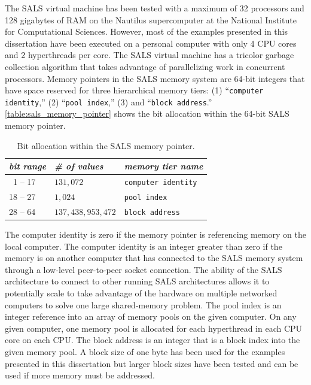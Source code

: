 The SALS virtual machine has been tested with a maximum of 32
processors and 128 gigabytes of RAM on the Nautilus supercomputer at
the National Institute for Computational Sciences.  However, most of
the examples presented in this dissertation have been executed on a
personal computer with only 4 CPU cores and 2 hyperthreads per core.
The SALS virtual machine has a tricolor garbage collection algorithm
that takes advantage of parallelizing work in concurrent processors.
Memory pointers in the SALS memory system are 64-bit integers that
have space reserved for three hierarchical memory tiers: (1)
``{\tt{computer identity}},'' (2) ``{\tt{pool index}},'' (3) and
``{\tt{block address}}.''
{\mbox{\autoref{table:sals_memory_pointer}}} shows the bit allocation
within the 64-bit SALS memory pointer.
\begin{table}
\centering
\begin{tabular}{|l|l|l|}
\hline
\emph{bit range} &\emph{\# of values} &\emph{memory tier name} \\
\hline
~1 -- 17 &$131,072$         &{\tt{computer identity}} \\ %
\hline
18 -- 27 &$1,024$           &{\tt{pool index}}        \\ %
\hline
28 -- 64 &$137,438,953,472$ &{\tt{block address}}     \\ %
\hline
\end{tabular}
\caption[Bit allocation within the SALS memory pointer.]{Bit
  allocation within the SALS memory pointer.}
\label{table:sals_memory_pointer}
\end{table}
The computer identity is zero if the memory pointer is referencing
memory on the local computer.  The computer identity is an integer
greater than zero if the memory is on another computer that has
connected to the SALS memory system through a low-level peer-to-peer
socket connection.  The ability of the SALS architecture to connect to
other running SALS architectures allows it to potentially scale to
take advantage of the hardware on multiple networked computers to
solve one large shared-memory problem.  The pool index is an integer
reference into an array of memory pools on the given computer.  On any
given computer, one memory pool is allocated for each hyperthread in
each CPU core on each CPU.  The block address is an integer that is a
block index into the given memory pool.  A block size of one byte has
been used for the examples presented in this dissertation but larger
block sizes have been tested and can be used if more memory must be
addressed.

